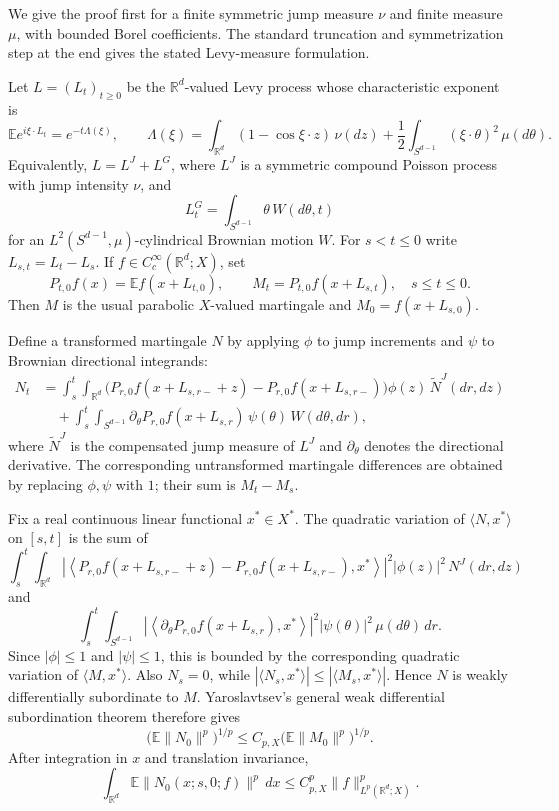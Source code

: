 \documentclass[11pt]{article}
\newcommand{\R}{\mathbb R}
\newcommand{\E}{\mathbb E}
\begin{document}
We give the proof first for a finite symmetric jump measure $\nu$ and finite
measure $\mu$, with bounded Borel coefficients.  The standard truncation and
symmetrization step at the end gives the stated Levy-measure formulation.

Let $L=(L_t)_{t\geq0}$ be the $\R^d$-valued Levy process whose characteristic
exponent is
\[
 \E e^{i\xi\cdot L_t}=e^{-t\Lambda(\xi)},\qquad
 \Lambda(\xi)=
 \int_{\R^d}(1-\cos \xi\cdot z)\,\nu(dz)
 +\frac12\int_{S^{d-1}}(\xi\cdot\theta)^2\,\mu(d\theta).
\]
Equivalently, $L=L^J+L^G$, where $L^J$ is a symmetric compound Poisson process
with jump intensity $\nu$, and
\[
        L^G_t=\int_{S^{d-1}}\theta\, W(d\theta,t)
\]
for an $L^2(S^{d-1},\mu)$-cylindrical Brownian motion $W$.  For
$s<t\leq0$ write $L_{s,t}=L_t-L_s$.  If $f\in C_c^\infty(\R^d;X)$, set
\[
        P_{t,0}f(x)=\E f(x+L_{t,0}),\qquad
        M_t=P_{t,0}f(x+L_{s,t}),\quad s\leq t\leq0.
\]
Then $M$ is the usual parabolic $X$-valued martingale and
$M_0=f(x+L_{s,0})$.

Define a transformed martingale $N$ by applying $\phi$ to jump increments and
$\psi$ to Brownian directional integrands:
\[
\begin{aligned}
N_t
&=
\int_s^t\int_{\R^d}
 \bigl(P_{r,0}f(x+L_{s,r-}+z)-P_{r,0}f(x+L_{s,r-})\bigr)
 \phi(z)\,\widetilde N^J(dr,dz)       \\
&\quad+
\int_s^t\int_{S^{d-1}}
 \partial_\theta P_{r,0}f(x+L_{s,r})\,\psi(\theta)\,
 W(d\theta,dr),
\end{aligned}
\]
where $\widetilde N^J$ is the compensated jump measure of $L^J$ and
$\partial_\theta$ denotes the directional derivative.  The corresponding
untransformed martingale differences are obtained by replacing
$\phi,\psi$ with $1$; their sum is $M_t-M_s$.

Fix a real continuous linear functional $x^*\in X^*$.  The quadratic variation
of $\langle N,x^*\rangle$ on $[s,t]$ is the sum of
\[
\int_s^t\int_{\R^d}
 \left|\left\langle
 P_{r,0}f(x+L_{s,r-}+z)-P_{r,0}f(x+L_{s,r-}),x^*
 \right\rangle\right|^2
 |\phi(z)|^2\,N^J(dr,dz)
\]
and
\[
\int_s^t\int_{S^{d-1}}
 \left|\left\langle \partial_\theta P_{r,0}f(x+L_{s,r}),x^*\right\rangle\right|^2
 |\psi(\theta)|^2\,\mu(d\theta)\,dr .
\]
Since $|\phi|\leq1$ and $|\psi|\leq1$, this is bounded by the corresponding
quadratic variation of $\langle M,x^*\rangle$.  Also $N_s=0$, while
$|\langle N_s,x^*\rangle|\leq |\langle M_s,x^*\rangle|$.  Hence $N$
is weakly differentially subordinate to $M$.  Yaroslavtsev's general weak
differential subordination theorem \cite[Theorem 4.1]{Yaroslavtsev2017Decompositions}
therefore gives
\[
 \bigl(\E\|N_0\|^p\bigr)^{1/p}
 \leq C_{p,X}\bigl(\E\|M_0\|^p\bigr)^{1/p}.
\]
After integration in $x$ and translation invariance,
\[
 \int_{\R^d}\E\|N_0(x;s,0;f)\|^p\,dx
 \leq C_{p,X}^p\|f\|_{L^p(\R^d;X)}^p .
\]
\end{document}
